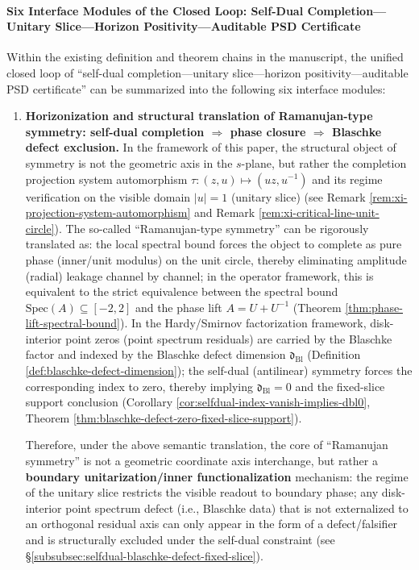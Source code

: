\paragraph{Six Interface Modules of the Closed Loop: Self-Dual Completion—Unitary Slice—Horizon Positivity—Auditable PSD Certificate}
Within the existing definition and theorem chains in the manuscript, the unified closed loop of ``self-dual completion—unitary slice—horizon positivity—auditable PSD certificate'' can be summarized into the following six interface modules:
\begin{enumerate}
  \item \textbf{Horizonization and structural translation of Ramanujan-type symmetry: self-dual completion \(\Rightarrow\) phase closure \(\Rightarrow\) Blaschke defect exclusion.}
  In the framework of this paper, the structural object of symmetry is not the geometric axis in the \(s\)-plane, but rather the completion projection system automorphism
  \(\tau:(z,u)\mapsto(uz,u^{-1})\) and its regime verification on the visible domain \(|u|=1\) (unitary slice) (see Remark \ref{rem:xi-projection-system-automorphism} and Remark \ref{rem:xi-critical-line-unit-circle}).
  The so-called ``Ramanujan-type symmetry'' can be rigorously translated as: the local spectral bound forces the object to complete as pure phase (inner/unit modulus) on the unit circle, thereby eliminating amplitude (radial) leakage channel by channel;
  in the operator framework, this is equivalent to the strict equivalence between the spectral bound \(\mathrm{Spec}(A)\subseteq[-2,2]\) and the phase lift \(A=U+U^{-1}\) (Theorem \ref{thm:phase-lift-spectral-bound}).
  In the Hardy/Smirnov factorization framework, disk-interior point zeros (point spectrum residuals) are carried by the Blaschke factor and indexed by the Blaschke defect dimension \(\mathfrak d_{\mathrm{Bl}}\) (Definition \ref{def:blaschke-defect-dimension});
  the self-dual (antilinear) symmetry forces the corresponding index to zero, thereby implying \(\mathfrak d_{\mathrm{Bl}}=0\) and the fixed-slice support conclusion (Corollary \ref{cor:selfdual-index-vanish-implies-dbl0}, Theorem \ref{thm:blaschke-defect-zero-fixed-slice-support}).
  \par
  Therefore, under the above semantic translation, the core of ``Ramanujan symmetry'' is not a geometric coordinate axis interchange, but rather a \textbf{boundary unitarization/inner functionalization} mechanism: the regime of the unitary slice restricts the visible readout to boundary phase; any disk-interior point spectrum defect (i.e., Blaschke data) that is not externalized to an orthogonal residual axis can only appear in the form of a defect/falsifier and is structurally excluded under the self-dual constraint (see \S\ref{subsubsec:selfdual-blaschke-defect-fixed-slice}).

\end{enumerate}
